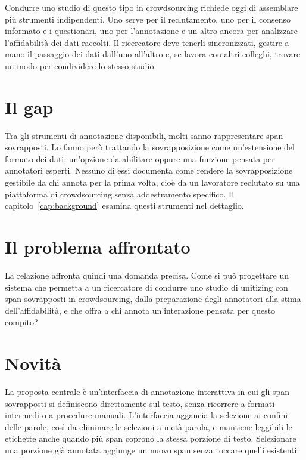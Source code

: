 \documentclass[]{sapthesis}
\begin{document}
Condurre uno studio di questo tipo in crowdsourcing richiede oggi di assemblare più strumenti indipendenti. Uno serve per il reclutamento, uno per il consenso informato e i questionari, uno per l'annotazione e un altro ancora per analizzare l'affidabilità dei dati raccolti. Il ricercatore deve tenerli sincronizzati, gestire a mano il passaggio dei dati dall'uno all'altro e, se lavora con altri colleghi, trovare un modo per condividere lo stesso studio.

\section{Il gap}
\label{sec:intro-gap}

Tra gli strumenti di annotazione disponibili, molti sanno rappresentare span sovrapposti. Lo fanno però trattando la sovrapposizione come un'estensione del formato dei dati, un'opzione da abilitare oppure una funzione pensata per annotatori esperti. Nessuno di essi documenta come rendere la sovrapposizione gestibile da chi annota per la prima volta, cioè da un lavoratore reclutato su una piattaforma di crowdsourcing senza addestramento specifico. Il capitolo~\ref{cap:background} esamina questi strumenti nel dettaglio.

\section{Il problema affrontato}
\label{sec:problema}

La relazione affronta quindi una domanda precisa. Come si può progettare un sistema che permetta a un ricercatore di condurre uno studio di unitizing con span sovrapposti in crowdsourcing, dalla preparazione degli annotatori alla stima dell'affidabilità, e che offra a chi annota un'interazione pensata per questo compito?

\section{Novità}
\label{sec:novelty}

La proposta centrale è un'interfaccia di annotazione interattiva in cui gli span sovrapposti si definiscono direttamente sul testo, senza ricorrere a formati intermedi o a procedure manuali. L'interfaccia aggancia la selezione ai confini delle parole, così da eliminare le selezioni a metà parola, e mantiene leggibili le etichette anche quando più span coprono la stessa porzione di testo. Selezionare una porzione già annotata aggiunge un nuovo span senza toccare quelli esistenti.
\end{document}
